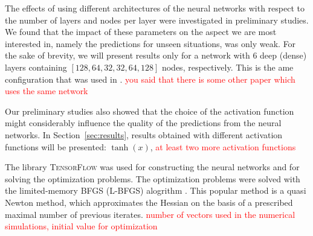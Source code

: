 The effects of using different architectures of the neural networks with respect to the number of layers 
and nodes per layer were investigated in preliminary studies. We found that the impact of these parameters 
on the aspect we are most interested in, namely the predictions for unseen situations, was only weak. 
For the sake of brevity, we will present results only for a network with $6$ deep (dense) layers containing $[128, 64, 32, 32, 64, 128]$ nodes, respectively. This is the ame configuration that was used in 
\cite{??}. \textcolor{red}{you said that there is some other paper which uses the same network}

Our preliminary studies also showed that the choice of the activation function might considerably influence the 
quality of the predictions from the neural networks. In Section~\ref{sec:results}, results obtained 
with different activation functions will be presented: $\tanh(x)$, 
\textcolor{red}{at least two more activation functions}

The library \textsc{TensorFlow} \cite{tensorflow2015-whitepaper} was used for constructing the neural networks and for solving the optimization problems. 
The optimization problems were solved with the 
limited-memory BFGS (L-BFGS) alogrithm  \cite{NW06}. This popular method is a  quasi  Newton method, which approximates the 
Hessian on the basis of  a prescribed maximal number of previous iterates.
\textcolor{red}{number of vectors used in the numerical simulations, initial value for optimization}

